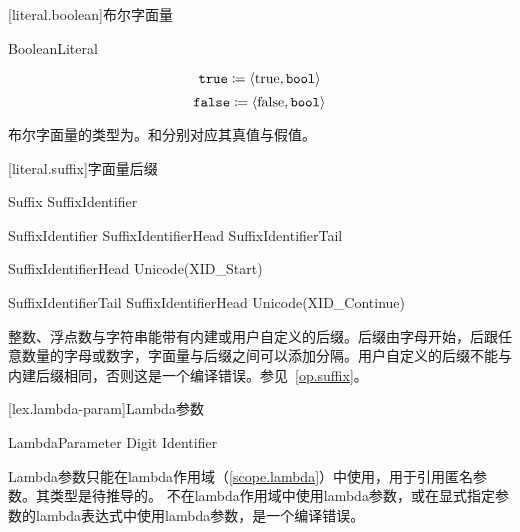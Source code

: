 [literal.boolean]{布尔字面量}

\begin{bnf}{BooleanLiteral}
     \br
\end{bnf}

$$ \texttt{true} \coloneqq \langle \mathrm{true}, \texttt{bool} \rangle $$
$$ \texttt{false} \coloneqq \langle \mathrm{false}, \texttt{bool} \rangle $$

\pnum
布尔字面量的类型为。和分别对应其真值与假值。

[literal.suffix]{字面量后缀}

\begin{bnf}{Suffix}
    \terminal{_}\bnfq SuffixIdentifier
\end{bnf}

\begin{bnf}{SuffixIdentifier}
    SuffixIdentifierHead SuffixIdentifierTail\bnfs
\end{bnf}

\begin{bnf}{SuffixIdentifierHead}
    Unicode(XID_Start)
\end{bnf}

\begin{bnf}{SuffixIdentifierTail}
    SuffixIdentifierHead \br
    Unicode(XID_Continue)
\end{bnf}

\pnum
整数、浮点数与字符串能带有内建或用户自定义的后缀。后缀由字母开始，后跟任意数量的字母或数字，字面量与后缀之间可以添加\tcode{_}分隔。用户自定义的后缀不能与内建后缀相同，否则这是一个编译错误。参见~\ref{op.suffix}。

[lex.lambda-param]{Lambda参数}

\begin{bnf}{LambdaParameter}
    \terminal{\$} Digit\bnfp \br
    \terminal{\$} Identifier
\end{bnf}

\pnum
Lambda参数只能在lambda作用域（\ref{scope.lambda}）中使用，用于引用匿名参数。其类型是待推导的。
不在lambda作用域中使用lambda参数，或在显式指定参数的lambda表达式中使用lambda参数，是一个编译错误。